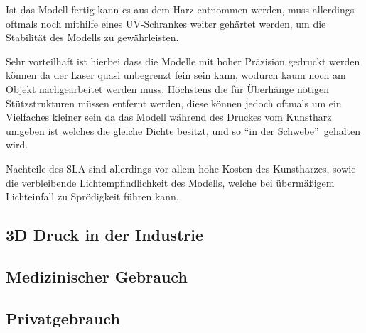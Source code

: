 Ist das Modell fertig kann es aus dem Harz entnommen werden, muss allerdings oftmals noch mithilfe eines UV-Schrankes weiter gehärtet werden, um die Stabilität des Modells zu gewährleisten.

Sehr vorteilhaft ist hierbei dass die Modelle mit hoher Präzision gedruckt werden können da der Laser quasi unbegrenzt fein sein kann, wodurch kaum noch am Objekt nachgearbeitet werden muss. Höchstens die für Überhänge nötigen Stützstrukturen müssen entfernt werden, diese können jedoch oftmals um ein Vielfaches kleiner sein da das Modell während des Druckes vom Kunstharz umgeben ist welches die gleiche Dichte besitzt, und so \textquotedblleft in der Schwebe\textquotedblright ~gehalten wird.

Nachteile des SLA sind allerdings vor allem hohe Kosten des Kunstharzes, sowie die verbleibende Lichtempfindlichkeit des Modells, welche bei übermäßigem Lichteinfall zu Sprödigkeit führen kann. \parencite[Informationen aus:][]{DRUCKVERFAHREN}

\subsection{3D Druck in der Industrie}
\subsection{Medizinischer Gebrauch}
\subsection{Privatgebrauch}